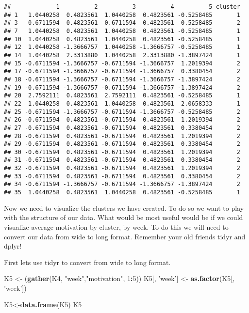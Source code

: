 \documentclass[]{article}
\newenvironment{Shaded}{\begin{snugshade}}{\end{snugshade}}
\newcommand{\DecValTok}[1]{\textcolor[rgb]{0.00,0.00,0.81}{#1}}
\newcommand{\KeywordTok}[1]{\textcolor[rgb]{0.13,0.29,0.53}{\textbf{#1}}}
\newcommand{\NormalTok}[1]{#1}
\newcommand{\OperatorTok}[1]{\textcolor[rgb]{0.81,0.36,0.00}{\textbf{#1}}}
\newcommand{\StringTok}[1]{\textcolor[rgb]{0.31,0.60,0.02}{#1}}
\begin{document}
\begin{verbatim}
##             1          2          3          4          5 cluster
## 1   1.0440258  0.4823561  1.0440258  0.4823561 -0.5258485       1
## 3  -0.6711594  0.4823561 -0.6711594  0.4823561 -0.5258485       2
## 7   1.0440258  0.4823561  1.0440258  0.4823561 -0.5258485       1
## 10  1.0440258  0.4823561  1.0440258  0.4823561 -0.5258485       1
## 12  1.0440258 -1.3666757  1.0440258 -1.3666757 -0.5258485       1
## 14  1.0440258  2.3313880  1.0440258  2.3313880 -1.3897424       1
## 15 -0.6711594 -1.3666757 -0.6711594 -1.3666757  1.2019394       2
## 17 -0.6711594 -1.3666757 -0.6711594 -1.3666757  0.3380454       2
## 18 -0.6711594 -1.3666757 -0.6711594 -1.3666757 -1.3897424       2
## 19 -0.6711594 -1.3666757 -0.6711594 -1.3666757 -1.3897424       2
## 20  2.7592111  0.4823561  2.7592111  0.4823561 -0.5258485       1
## 22  1.0440258  0.4823561  1.0440258  0.4823561  2.0658333       1
## 25 -0.6711594 -1.3666757 -0.6711594 -1.3666757 -0.5258485       2
## 26 -0.6711594  0.4823561 -0.6711594  0.4823561  1.2019394       2
## 27 -0.6711594  0.4823561 -0.6711594  0.4823561  0.3380454       2
## 28 -0.6711594  0.4823561 -0.6711594  0.4823561  1.2019394       2
## 29 -0.6711594  0.4823561 -0.6711594  0.4823561  0.3380454       2
## 30 -0.6711594  0.4823561 -0.6711594  0.4823561  1.2019394       2
## 31 -0.6711594  0.4823561 -0.6711594  0.4823561  0.3380454       2
## 32 -0.6711594  0.4823561 -0.6711594  0.4823561  1.2019394       2
## 33 -0.6711594  0.4823561 -0.6711594  0.4823561  0.3380454       2
## 34 -0.6711594 -1.3666757 -0.6711594 -1.3666757 -1.3897424       2
## 35  1.0440258  0.4823561  1.0440258  0.4823561 -0.5258485       1
\end{verbatim}

Now we need to visualize the clusters we have created. To do so we want
to play with the structure of our data. What would be most useful would
be if we could visualize average motivation by cluster, by week. To do
this we will need to convert our data from wide to long format. Remember
your old friends tidyr and dplyr!

First lets use tidyr to convert from wide to long format.

\begin{Shaded}
\begin{Highlighting}[]
\NormalTok{K5 <-}\StringTok{ }\NormalTok{(}\KeywordTok{gather}\NormalTok{(K4, }\StringTok{"week"}\NormalTok{,}\StringTok{"motivation"}\NormalTok{, }\DecValTok{1}\OperatorTok{:}\DecValTok{5}\NormalTok{))}
\NormalTok{K5[, }\StringTok{'week'}\NormalTok{] <-}\StringTok{ }\KeywordTok{as.factor}\NormalTok{(K5[, }\StringTok{'week'}\NormalTok{])}

\NormalTok{K5<-}\KeywordTok{data.frame}\NormalTok{(K5)}
\NormalTok{K5}
\end{Highlighting}
\end{Shaded}
\end{document}
